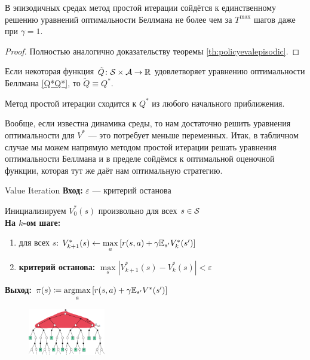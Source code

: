 \begin{theorem}
В эпизодичных средах метод простой итерации сойдётся к единственному решению уравнений оптимальности Беллмана не более чем за $T^{\max}$ шагов даже при $\gamma = 1$.
\begin{proof} Полностью аналогично доказательству теоремы \ref{th:policyevalepisodic}.
\end{proof}
\end{theorem}

\begin{proposition}
Если некоторая функция $\tilde{Q} \colon \mathcal{S} \times \mathcal{A} \to \mathbb{R}$ удовлетворяет уравнению оптимальности Беллмана \eqref{Q*Q*}, то $\tilde{Q} \equiv Q^*$.
\end{proposition}

\begin{proposition}
Метод простой итерации сходится к $Q^*$ из любого начального приближения.
\end{proposition}

Вообще, если известна динамика среды, то нам достаточно решить уравнения оптимальности для $V^*$ --- это потребует меньше переменных. Итак, в табличном случае мы можем напрямую методом простой итерации решать уравнения оптимальности Беллмана и в пределе сойдёмся к оптимальной оценочной функции, которая тут же даёт нам оптимальную стратегию.

\begin{algorithm}[label=valueiteration]{Value Iteration}
\textbf{Вход:} $\varepsilon$ --- критерий останова

\vspace{0.3cm}
Инициализируем $V^*_0(s)$ произвольно для всех $s \in \mathcal{S}$ \\
\textbf{На $k$-ом шаге:}
\begin{enumerate}
    \item для всех $s$: $V^*_{k+1}(s) \leftarrow \max\limits_a \left[ r(s, a) + \gamma \mathbb{E}_{s'} V^*_k(s')\right]$
    \item \textbf{критерий останова:} $\max\limits_{s} | V^*_{k+1}(s) - V^*_k(s) | < \varepsilon$
\end{enumerate}

\vspace{0.3cm}
\textbf{Выход:} $\pi(s) \coloneqq \mathop{\mathrm{argmax}}\limits_a \left[ r(s, a) + \gamma \mathbb{E}_{s'} V^*(s')\right]$
\end{algorithm}

\begin{figure}
\centering
\includegraphics[width=0.3\textwidth]{Images/DP_backup.png}
\end{figure}

